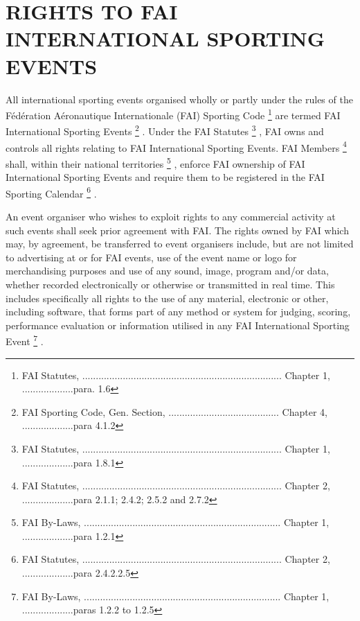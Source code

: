 \documentclass{article}
\begin{document}
\section*{RIGHTS TO FAI INTERNATIONAL SPORTING EVENTS}
All international sporting events organised wholly or partly under the rules of
the Fédération Aéronautique Internationale (FAI) Sporting Code
\footnote{FAI Statutes, ..........................................................................  Chapter 1, ...................para. 1.6}
are termed FAI International Sporting Events
\footnote{FAI Sporting Code, Gen. Section, ......................................... Chapter 4, ...................para 4.1.2}
. Under the FAI Statutes
\footnote{FAI Statutes, .......................................................................... Chapter 1, ...................para 1.8.1}
, FAI owns and controls all rights relating to FAI International Sporting
Events. FAI Members
\footnote{FAI Statutes, .......................................................................... Chapter 2, ...................para 2.1.1; 2.4.2; 2.5.2 and 2.7.2}
shall, within their national territories
\footnote{FAI By-Laws, ......................................................................... Chapter 1, ...................para 1.2.1}
, enforce FAI ownership of FAI International Sporting Events and require them
to be registered in the FAI Sporting Calendar
\footnote{FAI Statutes, .......................................................................... Chapter 2, ...................para 2.4.2.2.5}
.

An event organiser who wishes to exploit rights to any commercial activity at
such events shall seek prior agreement with FAI. The rights owned by FAI which
may, by agreement, be transferred to event organisers include, but are not
limited to advertising at or for FAI events, use of the event name or logo for
merchandising purposes and use of any sound, image, program and/or data,
whether recorded electronically or otherwise or transmitted in real time. This
includes specifically all rights to the use of any material, electronic or
other, including software, that forms part of any method or system for judging,
scoring, performance evaluation or information utilised in any FAI
International Sporting Event
\footnote{FAI By-Laws, ......................................................................... Chapter 1, ...................paras 1.2.2 to 1.2.5}
.
\end{document}
